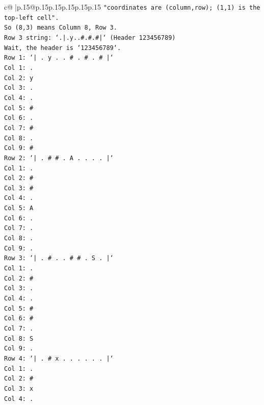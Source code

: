 \documentclass{article}
\begin{document}
{\begin{supertabular}{c@{$\;$}|p{.15\linewidth}@{}p{.15\linewidth}p{.15\linewidth}p{.15\linewidth}p{.15\linewidth}p{.15\linewidth}}
{{{\texttt{"coordinates are (column,row); (1,1) is the top{-}left cell".} \\
\texttt{So (8,3) means Column 8, Row 3.} \\
\texttt{Row 3 string: `.|.y..\#.\#.\#|` (Header 123456789)} \\
\texttt{Wait, the header is `123456789`.} \\
\texttt{Row 1: `| . y . . \# . \# . \# |`} \\
\texttt{Col 1: .} \\
\texttt{Col 2: y} \\
\texttt{Col 3: .} \\
\texttt{Col 4: .} \\
\texttt{Col 5: \#} \\
\texttt{Col 6: .} \\
\texttt{Col 7: \#} \\
\texttt{Col 8: .} \\
\texttt{Col 9: \#} \\
\texttt{Row 2: `| . \# \# . A . . . . |`} \\
\texttt{Col 1: .} \\
\texttt{Col 2: \#} \\
\texttt{Col 3: \#} \\
\texttt{Col 4: .} \\
\texttt{Col 5: A} \\
\texttt{Col 6: .} \\
\texttt{Col 7: .} \\
\texttt{Col 8: .} \\
\texttt{Col 9: .} \\
\texttt{Row 3: `| . \# . . \# \# . S . |`} \\
\texttt{Col 1: .} \\
\texttt{Col 2: \#} \\
\texttt{Col 3: .} \\
\texttt{Col 4: .} \\
\texttt{Col 5: \#} \\
\texttt{Col 6: \#} \\
\texttt{Col 7: .} \\
\texttt{Col 8: S} \\
\texttt{Col 9: .} \\
\texttt{Row 4: `| . \# x . . . . . . |`} \\
\texttt{Col 1: .} \\
\texttt{Col 2: \#} \\
\texttt{Col 3: x} \\
\texttt{Col 4: .} \\
}}}
\end{supertabular}}
\end{document}
